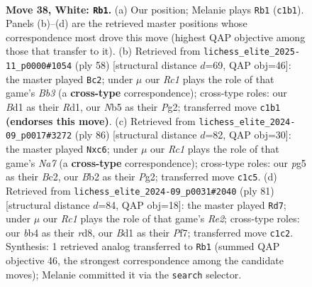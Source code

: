 \documentclass[11pt]{article}
\begin{document}
\clearpage

\begin{figure}[p]\centering
\begin{subfigure}{0.46\textwidth}\centering
\resizebox{\linewidth}{!}{%
\newchessgame
\chessboard[
  setfen={1nb2k2/1p6/1nr2p2/pN1p2p1/1b4Pp/1P2P2P/PB2PK2/2RB4 w - - 10 38},
  showmover=false,
  pgfstyle=straightmove, color=movearrow, markmove={c1-b1}
]}
\caption{}
\end{subfigure}\hfill
\begin{subfigure}{0.46\textwidth}\centering
\resizebox{\linewidth}{!}{%
\newchessgame
\chessboard[
  setfen={2k1r3/2n2p1p/p1p1bPp1/1p4B1/1P3P2/PB6/6PP/3R2K1 w - - 3 30},
  showmover=false,
  pgfstyle=straightmove, color=movearrow, markmove={b3-c2}
]}
\caption{}
\end{subfigure}
\\[4pt]
\begin{subfigure}{0.46\textwidth}\centering
\resizebox{\linewidth}{!}{%
\newchessgame
\chessboard[
  setfen={2R5/Np1r1kn1/2b3p1/p3ppBp/PbP4P/1P3P2/2B3P1/5K2 w - - 18 44},
  showmover=false,
  pgfstyle=straightmove, color=movearrow, markmove={a7-c6}
]}
\caption{}
\end{subfigure}\hfill
\begin{subfigure}{0.46\textwidth}\centering
\resizebox{\linewidth}{!}{%
\newchessgame
\chessboard[
  setfen={3R4/4rpbk/4b1p1/1p1Np3/2p1P1P1/1nP1BP2/1P2B1K1/8 b - - 3 41},
  showmover=false,
  pgfstyle=straightmove, color=movearrow, markmove={e7-d7}
]}
\caption{}
\end{subfigure}
\caption{\textbf{Move 38, White: \texttt{Rb1}.} (a) Our position; Melanie plays \texttt{Rb1} (\texttt{c1b1}). Panels (b)--(d) are the retrieved master positions whose correspondence most drove this move (highest QAP objective among those that transfer to it). (b) Retrieved from \texttt{lichess\_elite\_2025-11\_p0000\#1054} (ply 58) [structural distance $d$=69, QAP obj=46]: the master played \texttt{Bc2}; under $\mu$ our \emph{Rc1} plays the role of that game's \emph{Bb3} (a \textbf{cross-type} correspondence); cross-type roles: our \emph{B}d1 as their \emph{R}d1, our \emph{N}b5 as their \emph{P}g2; transferred move \texttt{c1b1} \textbf{(endorses this move)}. (c) Retrieved from \texttt{lichess\_elite\_2024-09\_p0017\#3272} (ply 86) [structural distance $d$=82, QAP obj=30]: the master played \texttt{Nxc6}; under $\mu$ our \emph{Rc1} plays the role of that game's \emph{Na7} (a \textbf{cross-type} correspondence); cross-type roles: our \emph{p}g5 as their \emph{B}c2, our \emph{B}b2 as their \emph{P}g2; transferred move \texttt{c1c5}. (d) Retrieved from \texttt{lichess\_elite\_2024-09\_p0031\#2040} (ply 81) [structural distance $d$=84, QAP obj=18]: the master played \texttt{Rd7}; under $\mu$ our \emph{Rc1} plays the role of that game's \emph{Re2}; cross-type roles: our \emph{b}b4 as their \emph{r}d8, our \emph{B}d1 as their \emph{P}f7; transferred move \texttt{c1c2}. Synthesis: 1 retrieved analog transferred to \texttt{Rb1} (summed QAP objective 46, the strongest correspondence among the candidate moves); Melanie committed it via the \texttt{search} selector.}
\label{fig:thought-m74}
\end{figure}
\end{document}
